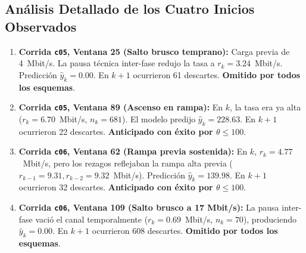 \documentclass[11pt,a4paper]{article}
\begin{document}
\subsection{Análisis Detallado de los Cuatro Inicios Observados}
\begin{enumerate}
    \item \textbf{Corrida \texttt{c05}, Ventana 25 (Salto brusco temprano):} Carga previa de 4~Mbit/s. La pausa técnica inter-fase redujo la tasa a $r_k = 3.24$~Mbit/s. Predicción $\hat{y}_k = 0.00$. En $k+1$ ocurrieron 61 descartes. \textbf{Omitido por todos los esquemas}.
    \item \textbf{Corrida \texttt{c05}, Ventana 89 (Ascenso en rampa):} En $k$, la tasa era ya alta ($r_k = 6.70$~Mbit/s, $n_k = 681$). El modelo predijo $\hat{y}_k = 228.63$. En $k+1$ ocurrieron 22 descartes. \textbf{Anticipado con éxito por $\theta \le 100$}.
    \item \textbf{Corrida \texttt{c06}, Ventana 62 (Rampa previa sostenida):} En $k$, $r_k = 4.77$~Mbit/s, pero los rezagos reflejaban la rampa alta previa ($r_{k-1} = 9.31, r_{k-2} = 9.32$~Mbit/s). Predicción $\hat{y}_k = 139.98$. En $k+1$ ocurrieron 32 descartes. \textbf{Anticipado con éxito por $\theta \le 100$}.
    \item \textbf{Corrida \texttt{c06}, Ventana 109 (Salto brusco a 17 Mbit/s):} La pausa inter-fase vació el canal temporalmente ($r_k = 0.69$~Mbit/s, $n_k = 70$), produciendo $\hat{y}_k = 0.00$. En $k+1$ ocurrieron 608 descartes. \textbf{Omitido por todos los esquemas}.
\end{enumerate}
\end{document}
